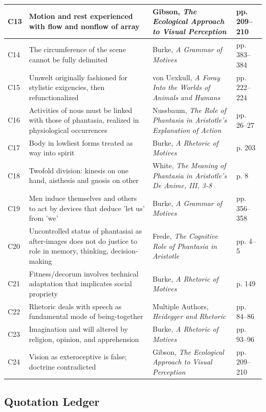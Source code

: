 \begin{center}
\begin{tabular}{|l|l|l|l|}
\hline
C13 & Motion and rest experienced with flow and nonflow of array & Gibson, \textit{The Ecological Approach to Visual Perception} & pp. 209--210 \\
\hline
C14 & The circumference of the scene cannot be fully delimited & Burke, \textit{A Grammar of Motives} & pp. 383--384 \\
\hline
C15 & Umwelt originally fashioned for stylistic exigencies, then refunctionalized & von Uexkull, \textit{A Foray Into the Worlds of Animals and Humans} & pp. 222--224 \\
\hline
C16 & Activities of nous must be linked with those of phantasia, realized in physiological occurrences & Nussbaum, \textit{The Role of Phantasia in Aristotle's Explanation of Action} & pp. 26--27 \\
\hline
C17 & Body in lowliest forms treated as way into spirit & Burke, \textit{A Rhetoric of Motives} & p. 203 \\
\hline
C18 & Twofold division: kinesis on one hand, aisthesis and gnosis on other & White, \textit{The Meaning of Phantasia in Aristotle's De Anime, III, 3-8} & p. 8 \\
\hline
C19 & Men induce themselves and others to act by devices that deduce 'let us' from 'we' & Burke, \textit{A Grammar of Motives} & pp. 356--358 \\
\hline
C20 & Uncontrolled status of phantasiai as after-images does not do justice to role in memory, thinking, decision-making & Frede, \textit{The Cognitive Role of Phantasia in Aristotle} & pp. 4--5 \\
\hline
C21 & Fitness/decorum involves technical adaptation that implicates social propriety & Burke, \textit{A Rhetoric of Motives} & p. 149 \\
\hline
C22 & Rhetoric deals with speech as fundamental mode of being-together & Multiple Authors, \textit{Heidegger and Rhetoric} & pp. 84--86 \\
\hline
C23 & Imagination and will altered by religion, opinion, and apprehension & Burke, \textit{A Rhetoric of Motives} & pp. 93--96 \\
\hline
C24 & Vision as exteroceptive is false; doctrine contradicted & Gibson, \textit{The Ecological Approach to Visual Perception} & pp. 209--210 \\
\hline
\end{tabular}
\end{center}

\subsection*{Quotation Ledger}

